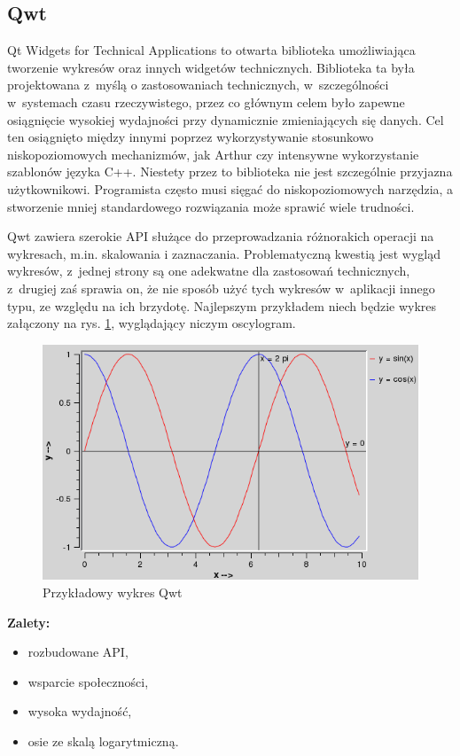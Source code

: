 \subsection{Qwt}
Qt Widgets for Technical Applications to otwarta biblioteka umożliwiająca tworzenie wykresów oraz innych widgetów technicznych. Biblioteka ta była projektowana z~myślą o zastosowaniach technicznych, w~szczególności w~systemach czasu rzeczywistego, przez co głównym celem było zapewne osiągnięcie wysokiej wydajności przy dynamicznie zmieniających się danych. Cel ten osiągnięto między innymi poprzez wykorzystywanie stosunkowo niskopoziomowych mechanizmów, jak Arthur czy intensywne wykorzystanie szablonów języka C++. Niestety przez to biblioteka nie jest szczególnie przyjazna użytkownikowi. Programista często musi sięgać do niskopoziomowych narzędzia, a stworzenie mniej standardowego rozwiązania może sprawić wiele trudności.\newline

Qwt zawiera szerokie API służące do przeprowadzania różnorakich operacji na wykresach, m.in. skalowania i zaznaczania. Problematyczną kwestią jest wygląd wykresów, z~jednej strony są one adekwatne dla zastosowań technicznych, z~drugiej zaś sprawia on, że nie sposób użyć tych wykresów w~aplikacji innego typu, ze względu na ich brzydotę. Najlepszym przykładem niech będzie wykres załączony na rys. \ref{rys:wykres:sinus}, wyglądający niczym oscylogram.
\begin{figure}
\centering
\includegraphics[scale=0.4]{img/sinus.png}
\caption{Przykładowy wykres Qwt}\label{rys:wykres:sinus}
\end{figure}

\textbf{Zalety:}
\begin{itemize}
\item{rozbudowane API,}
\item{wsparcie społeczności,}
\item{wysoka wydajność,}
\item{osie ze skalą logarytmiczną.}\newline
\end{itemize}

